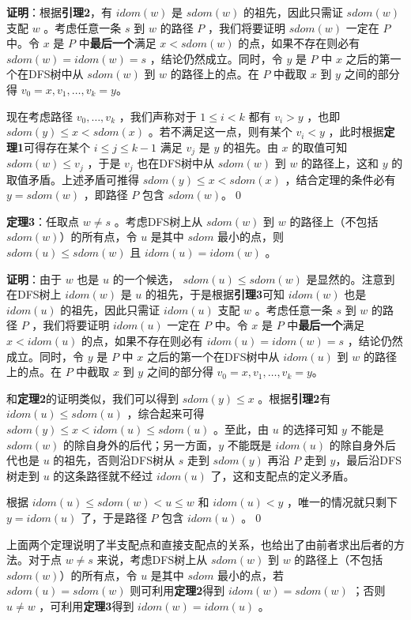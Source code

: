 \documentclass{noithesis}
\begin{document}
\textbf{证明}：根据\textbf{引理2}，有 $idom(w)$ 是 $sdom(w)$ 的祖先，因此只需证 $sdom(w)$ 支配 $w$ 。考虑任意一条 $s$ 到 $w$ 的路径 $P$ ，我们将要证明 $sdom(w)$ 一定在 $P$ 中。令 $x$ 是 $P$ 中\textbf{最后一个}满足 $x < sdom(w)$ 的点，如果不存在则必有 $sdom(w) = idom(w) = s$ ，结论仍然成立。同时，令 $y$ 是 $P$ 中 $x$ 之后的第一个在DFS树中从 $sdom(w)$ 到 $w$ 的路径上的点。在 $P$ 中截取 $x$ 到 $y$ 之间的部分得 $v_0 = x, v_1,\dots, v_k = y$。

现在考虑路径 $v_0,\dots,v_k$ ，我们声称对于 $1\le i<k$ 都有 $v_i > y$ ，也即 $sdom(y) \le x<sdom(x)$ 。若不满足这一点，则有某个 $v_i<y$ ，此时根据\textbf{定理1}可得存在某个 $i\le j\le k-1$ 满足 $v_j$ 是 $y$ 的祖先。由 $x$ 的取值可知 $sdom(w) \le v_j$ ，于是 $v_j$ 也在DFS树中从 $sdom(w)$ 到 $w$ 的路径上，这和 $y$ 的取值矛盾。上述矛盾可推得 $sdom(y)\le x < sdom(x)$ ，结合定理的条件必有 $y = sdom(w)$ ，即路径 $P$ 包含 $sdom(w)$。\qed

\textbf{定理3}：任取点 $w\neq s$ 。考虑DFS树上从 $sdom(w)$ 到 $w$ 的路径上（不包括 $sdom(w)$）的所有点，令 $u$ 是其中 $sdom$ 最小的点，则 $sdom(u)\le sdom(w)$ 且 $idom(u) = idom(w)$ 。

\textbf{证明}：由于 $w$ 也是 $u$ 的一个候选， $sdom(u)\le sdom(w)$ 是显然的。注意到在DFS树上 $idom(w)$ 是 $u$ 的祖先，于是根据\textbf{引理3}可知 $idom(w)$ 也是 $idom(u)$ 的祖先，因此只需证 $idom(u)$ 支配 $w$ 。考虑任意一条 $s$ 到 $w$ 的路径 $P$ ，我们将要证明 $idom(u)$ 一定在 $P$ 中。令 $x$ 是 $P$ 中\textbf{最后一个}满足 $x < idom(u)$ 的点，如果不存在则必有 $idom(u) = idom(w) = s$ ，结论仍然成立。同时，令 $y$ 是 $P$ 中 $x$ 之后的第一个在DFS树中从 $idom(u)$ 到 $w$ 的路径上的点。在 $P$ 中截取 $x$ 到 $y$ 之间的部分得 $v_0 = x, v_1,\dots, v_k = y$。

和\textbf{定理2}的证明类似，我们可以得到 $sdom(y)\le x$ 。根据\textbf{引理2}有 $idom(u)\le sdom(u)$ ，综合起来可得 $sdom(y)\le x<idom(u)\le sdom(u)$ 。至此，由 $u$ 的选择可知 $y$ 不能是 $sdom(w)$ 的除自身外的后代；另一方面，$y$ 不能既是 $idom(u)$ 的除自身外后代也是 $u$ 的祖先，否则沿DFS树从 $s$ 走到 $sdom(y)$ 再沿 $P$ 走到 $y$，最后沿DFS树走到 $u$ 的这条路径就不经过 $idom(u)$ 了，这和支配点的定义矛盾。

根据 $idom(u)\le sdom(w) < u\le w$ 和 $idom(u) < y$ ，唯一的情况就只剩下 $y = idom(u)$ 了，于是路径 $P$ 包含 $idom(u)$ 。\qed

上面两个定理说明了半支配点和直接支配点的关系，也给出了由前者求出后者的方法。对于点 $w\neq s$ 来说，考虑DFS树上从 $sdom(w)$ 到 $w$ 的路径上（不包括 $sdom(w)$）的所有点，令 $u$ 是其中 $sdom$ 最小的点，若 $sdom(u) = sdom(w)$ 则可利用\textbf{定理2}得到 $idom(w) = sdom(w)$ ；否则 $u\neq w$ ，可利用\textbf{定理3}得到 $idom(w) = idom(u)$ 。
\end{document}
